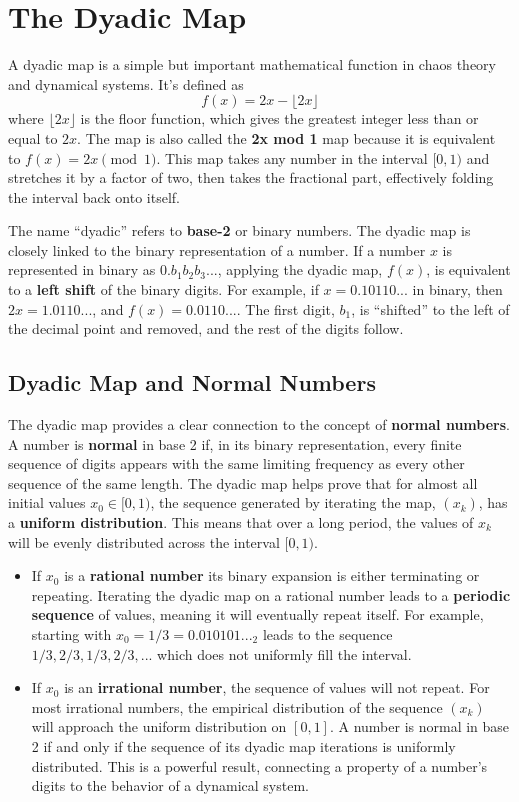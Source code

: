\documentclass[12pt,a4paper]{article}
\begin{document}
\section{The Dyadic Map}

A dyadic map is a simple but important mathematical function in chaos theory and dynamical systems. It's defined as 
\[
f(x) = 2x - \lfloor 2x \rfloor
\]
where $\lfloor 2x \rfloor$ is the floor function, which gives the greatest integer less than or equal to $2x$. The map is also called the \textbf{2x mod 1} map because it is equivalent to $f(x) = 2x \pmod{1}$. This map takes any number in the interval $[0, 1)$ and stretches it by a factor of two, then takes the fractional part, effectively folding the interval back onto itself.

The name ``dyadic'' refers to \textbf{base-2} or binary numbers. The dyadic map is closely linked to the binary representation of a number. If a number $x$ is represented in binary as $0.b_1b_2b_3...$, applying the dyadic map, $f(x)$, is equivalent to a \textbf{left shift} of the binary digits. For example, if $x = 0.10110...$ in binary, then $2x = 1.0110...$, and $f(x) = 0.0110...$. The first digit, $b_1$, is ``shifted'' to the left of the decimal point and removed, and the rest of the digits follow.

\subsection{Dyadic Map and Normal Numbers}

The dyadic map provides a clear connection to the concept of \textbf{normal numbers}. A number is \textbf{normal} in base 2 if, in its binary representation, every finite sequence of digits appears with the same limiting frequency as every other sequence of the same length. The dyadic map helps prove that for almost all initial values $x_0 \in [0, 1)$, the sequence generated by iterating the map, $(x_k)$, has a \textbf{uniform distribution}. This means that over a long period, the values of $x_k$ will be evenly distributed across the interval $[0, 1)$.

\begin{itemize}
    \item If $x_0$ is a \textbf{rational number} 
    its binary expansion is either terminating or repeating. Iterating the dyadic map on a rational number leads to a \textbf{periodic sequence} of values, meaning it will eventually repeat itself. For example, starting with $x_0 = 1/3 = 0.010101..._2$ leads to the sequence $1/3, 2/3, 1/3, 2/3, ...$ which does not uniformly fill the interval.
    \item If $x_0$ is an \textbf{irrational number}, the sequence of values will not repeat. For most irrational numbers, the empirical distribution of the sequence $(x_k)$ will approach the uniform distribution on $[0,1]$. A number is normal in base 2 if and only if the sequence of its dyadic map iterations is uniformly distributed. This is a powerful result, connecting a property of a number's digits to the behavior of a dynamical system.
\end{itemize}
\end{document}
